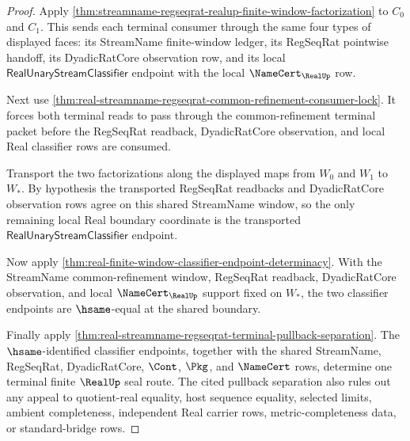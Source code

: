 \begin{proof}
Apply \autoref{thm:streamname-regseqrat-realup-finite-window-factorization}
to $C_0$ and $C_1$. This sends each terminal consumer through the same four
types of displayed faces: its StreamName finite-window ledger, its RegSeqRat
pointwise handoff, its DyadicRatCore observation row, and its local
$\mathsf{RealUnaryStreamClassifier}$ endpoint with the local
$\NameCert_{\RealUp}$ row.

Next use
\autoref{thm:real-streamname-regseqrat-common-refinement-consumer-lock}. It
forces both terminal reads to pass through the common-refinement terminal
packet before the RegSeqRat readback, DyadicRatCore observation, and local
Real classifier rows are consumed.

Transport the two factorizations along the displayed maps from $W_0$ and
$W_1$ to $W_\ast$. By hypothesis the transported RegSeqRat readbacks and
DyadicRatCore observation rows agree on this shared StreamName window, so the
only remaining local Real boundary coordinate is the transported
$\mathsf{RealUnaryStreamClassifier}$ endpoint.

Now apply \autoref{thm:real-finite-window-classifier-endpoint-determinacy}.
With the StreamName common-refinement window, RegSeqRat readback,
DyadicRatCore observation, and local $\NameCert_{\RealUp}$ support fixed on
$W_\ast$, the two classifier endpoints are $\hsame$-equal at the shared
boundary.

Finally apply
\autoref{thm:real-streamname-regseqrat-terminal-pullback-separation}. The
$\hsame$-identified classifier endpoints, together with the shared
StreamName, RegSeqRat, DyadicRatCore, $\Cont$, $\Pkg$, and $\NameCert$ rows,
determine one terminal finite $\RealUp$ seal route. The cited pullback
separation also rules out any appeal to quotient-real equality, host sequence
equality, selected limits, ambient completeness, independent Real carrier
rows, metric-completeness data, or standard-bridge rows.
\end{proof}

